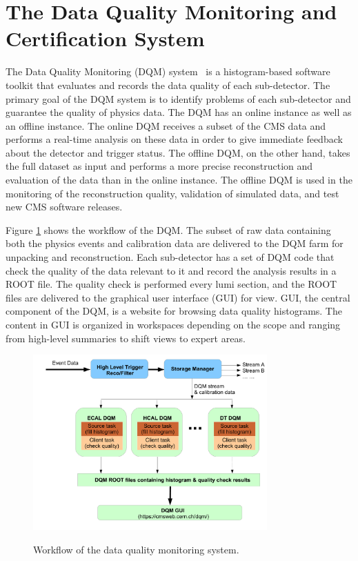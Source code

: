 \documentclass[thesis.tex]{subfiles}
\begin{document}
\section{The Data Quality Monitoring and Certification System}
The Data Quality Monitoring (DQM) system~\cite{DQMFEDE} is a histogram-based software toolkit that evaluates and records the data quality of each sub-detector.
The primary goal of the DQM system is to identify problems of each sub-detector and guarantee the quality of physics data. 
The DQM has an online instance as well as an offline instance. 
The online DQM receives a subset of the CMS data and performs a real-time analysis on these data in order to give immediate feedback about the detector and trigger status. 
The offline DQM, on the other hand, takes the full dataset as input and performs a more precise reconstruction and evaluation of the data than in the online instance.
The offline DQM is used in the monitoring of the reconstruction quality, validation of simulated data, and test new CMS software releases.

Figure \ref{fig:dqmworkflow} shows the workflow of the DQM. 
The subset of raw data containing both the physics events and calibration data are delivered to the DQM farm for unpacking and reconstruction.
Each sub-detector has a set of DQM code that check the quality of the data relevant to it and record the analysis results in a ROOT file.
The quality check is performed every lumi section, and the ROOT files are delivered to the graphical user interface (GUI) for view.
GUI, the central component of the DQM, is a website for browsing data quality histograms.
The content in GUI is organized in workspaces depending on the scope and ranging from high-level summaries to shift views to expert areas.  

\begin{figure}[hbt]
	\centering
	\includegraphics[width=0.8\textwidth]{Fig/DQMFlow.pdf}
	\label{fig:dqmworkflow}
	\caption{Workflow of the data quality monitoring system.}
\end{figure}
\end{document}
